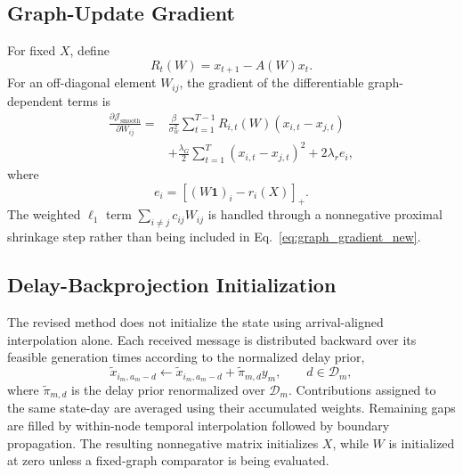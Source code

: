 \subsection{Graph-Update Gradient}
\label{subsec:graph_gradient}
For fixed $X$, define
\begin{equation}
    R_t(W)=x_{t+1}-A(W)x_t.
    \label{eq:dynamic_residual_new}
\end{equation}
For an off-diagonal element $W_{ij}$, the gradient of the differentiable graph-dependent terms is
\begin{align}
    \frac{\partial\mathcal{J}_{\mathrm{smooth}}}{\partial W_{ij}}
    ={}&
    \frac{\beta}{\sigma_w^2}
    \sum_{t=1}^{T-1}
    R_{i,t}(W)\left(x_{i,t}-x_{j,t}\right)
    \nonumber\\
    &+\frac{\lambda_G}{2}
    \sum_{t=1}^{T}
    \left(x_{i,t}-x_{j,t}\right)^2
    +2\lambda_r e_i,
    \label{eq:graph_gradient_new}
\end{align}
where
\begin{equation}
    e_i=\left[(W\mathbf{1})_i-r_i(X)\right]_{+}.
    \label{eq:row_excess_new}
\end{equation}
The weighted $\ell_1$ term $\sum_{i\neq j}c_{ij}W_{ij}$ is handled through a nonnegative proximal shrinkage step rather than being included in Eq.~\eqref{eq:graph_gradient_new}.

\subsection{Delay-Backprojection Initialization}
\label{subsec:backprojection_initialization}
The revised method does not initialize the state using arrival-aligned interpolation alone. Each received message is distributed backward over its feasible generation times according to the normalized delay prior,
\begin{equation}
    \widetilde{x}_{i_m,a_m-d}
    \leftarrow
    \widetilde{x}_{i_m,a_m-d}
    +\widetilde{\pi}_{m,d}y_m,
    \qquad d\in\mathcal{D}_m,
    \label{eq:backprojection_initialization_new}
\end{equation}
where $\widetilde{\pi}_{m,d}$ is the delay prior renormalized over $\mathcal{D}_m$. Contributions assigned to the same state-day are averaged using their accumulated weights. Remaining gaps are filled by within-node temporal interpolation followed by boundary propagation. The resulting nonnegative matrix initializes $X$, while $W$ is initialized at zero unless a fixed-graph comparator is being evaluated.

